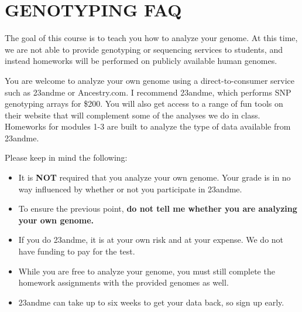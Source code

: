 \documentclass[12pt]{article}
\begin{document}
\section*{GENOTYPING FAQ}
The goal of this course is to teach you how to analyze your genome. At this time, we are not able to provide genotyping or sequencing services to students, and instead homeworks will be performed on publicly available human genomes. 

You are welcome to analyze your own genome using a direct-to-consumer service such as 23andme or Ancestry.com. I recommend 23andme, which performs SNP genotyping arrays for \$200. You will also get access to a range of fun tools on their website that will complement some of the analyses we do in class. Homeworks for modules 1-3 are built to analyze the type of data available from 23andme. 

Please keep in mind the following:
\begin{itemize}
\item It is \textbf{NOT} required that you analyze your own genome. Your grade is in no way influenced by whether or not you participate in 23andme.
\item To ensure the previous point, \textbf{do not tell me whether you are analyzing your own genome.}
\item If you do 23andme, it is at your own risk and at your expense. We do not have funding to pay for the test.
\item While you are free to analyze your genome, you must still complete the homework assignments with the provided genomes as well.
\item 23andme can take up to six weeks to get your data back, so sign up early.
\end{itemize}


\end{document}
